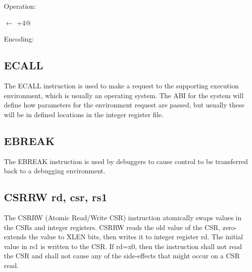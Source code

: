 Operation:

\verb@pc@ $\leftarrow$ \verb@pc+4@

Encoding:



\subsection{ECALL}

The ECALL instruction is used to make a request to the supporting 
execution environment, which is usually an operating system. The ABI 
for the system will define how parameters for the environment
request are passed, but usually these will be in defined locations 
in the integer register file.~\cite[p.~24]{rvismv1v22:2017}



\subsection{EBREAK}

The EBREAK instruction is used by debuggers to cause control to be 
transferred back to a debugging environment.~\cite[p.~24]{rvismv1v22:2017}


\subsection{CSRRW rd, csr, rs1}

The CSRRW (Atomic Read/Write CSR) instruction atomically swaps values in 
the CSRs and integer registers. CSRRW reads the old value of the CSR, 
zero-extends the value to XLEN bits, then writes it to integer register rd. 
The initial value in rs1 is written to the CSR. If rd=x0, then the 
instruction shall not read the CSR and shall not cause any of the 
side-effects that might occur on a CSR read.~\cite[p.~22]{rvismv1v22:2017}


